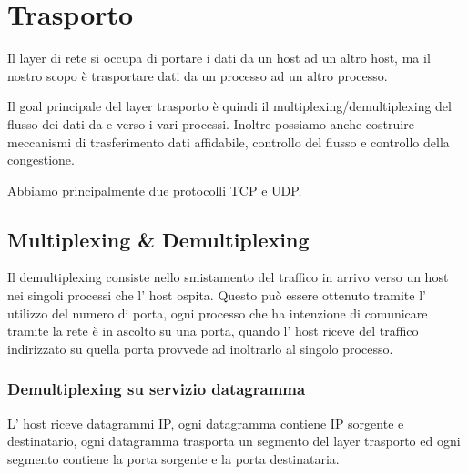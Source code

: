 \section{Trasporto}
Il layer di rete si occupa di portare i dati da un host ad un altro host, ma il nostro scopo è trasportare dati da un processo ad un altro processo.

Il goal principale del layer trasporto è quindi il multiplexing/demultiplexing del flusso dei dati da e verso i vari processi.
Inoltre possiamo anche costruire meccanismi di trasferimento dati affidabile, controllo del flusso e controllo della congestione.

Abbiamo principalmente due protocolli TCP e UDP.

\subsection{Multiplexing \& Demultiplexing}
Il demultiplexing consiste nello smistamento del traffico in arrivo verso un host nei singoli processi che l' host ospita.
Questo può essere ottenuto tramite l' utilizzo del numero di porta, ogni processo che ha intenzione di comunicare tramite la rete è in ascolto su una porta, quando l' host riceve del traffico indirizzato su quella porta provvede ad inoltrarlo al singolo processo.

\subsubsection{Demultiplexing su servizio datagramma}
L' host riceve datagrammi IP, ogni datagramma contiene IP sorgente e destinatario, ogni datagramma trasporta un segmento del layer trasporto ed ogni segmento contiene la porta sorgente e la porta destinataria.

